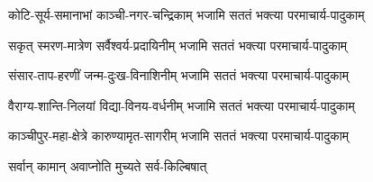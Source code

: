 

\twolineshloka
{कोटि-सूर्य-समानाभां काञ्ची-नगर-चन्द्रिकाम्}
{भजामि सततं भक्त्या परमाचार्य-पादुकाम्}

\twolineshloka
{सकृत् स्मरण-मात्रेण सर्वैश्वर्य-प्रदायिनीम्}
{भजामि सततं भक्त्या परमाचार्य-पादुकाम्}

\twolineshloka
{संसार-ताप-हरणीं जन्म-दुःख-विनाशिनीम्}
{भजामि सततं भक्त्या परमाचार्य-पादुकाम्}

\twolineshloka
{वैराग्य-शान्ति-निलयां विद्या-विनय-वर्धनीम्}
{भजामि सततं भक्त्या परमाचार्य-पादुकाम्}

\twolineshloka
{काञ्चीपुर-महा-क्षेत्रे कारुण्यामृत-सागरीम्}
{भजामि सततं भक्त्या परमाचार्य-पादुकाम्}

{सर्वान् कामान् अवाप्नोति मुच्यते सर्व-किल्बिषात्}
